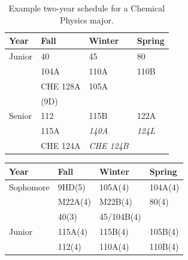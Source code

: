\documentclass[12pt]{article}
\begin{document}
\begin{table}[htbp]
\caption{\label{tbl:sched-chemical} Example two-year schedule for a
  Chemical Physics major.}
\begin{center}
\begin{tabular}{|l|l|l|l|}
\hline
Year      & Fall    & Winter & Spring \\
\hline
Junior    & 40        & 45    & 80 \\
          & 104A      & 110A  & 110B \\
          & CHE 128A  & 105A  & \\
          & (9D)      &       & \\
\hline
Senior   & 112        & 115B           & 122A \\
         & 115A       & {\it 140A}     & {\it 124L} \\
         & CHE 124A   & {\it CHE 124B} & \\
\hline
\end{tabular}
\end{center}
\end{table}




\newpage

\label{tbl:guide-first}
\begin{center}
\begin{tabular}{|l|l|l|l|}
\hline
Year      & Fall    & Winter & Spring \\
\hline
Sophomore & 9HD(5)        & 105A(4)       & 104A(4)  \\
          & M22A(4)       & M22B(4)       & 80(4)  \\
          & 40(3)         & 45/104B(4)    & \\
\hline
Junior    & 115A(4) & 115B(4)  & 105B(4)\\
          & 112(4)  & 110A(4)  & 110B(4)\\
\hline 
\end{tabular}
\vskip 1cm
\end{center}
\end{document}
